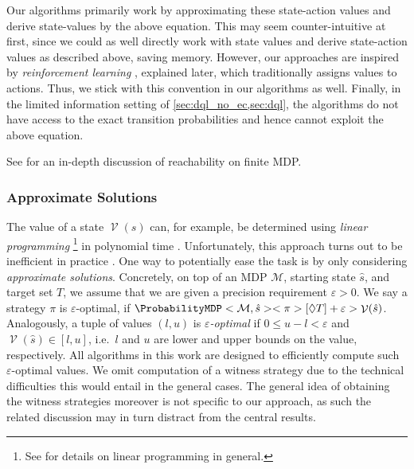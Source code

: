 \documentclass{article}
\newcommand{\MDP}{\mathcal{M}}
\newcommand{\initialstate}{\hat{s}}
\newcommand{\strategy}{\pi}
\newcommand{\reach}{\Diamond}
\DeclareMathOperator{\val}{\mathcal{V}}
\newcommand{\targetset}{T}
\begin{document}
\begin{remark}
	Our algorithms primarily work by approximating these state-action values and derive state-values by the above equation.
	This may seem counter-intuitive at first, since we could as well directly work with state values and derive state-action values as described above, saving memory.
	However, our approaches are inspired by \emph{reinforcement learning} \cite{DBLP:books/lib/SuttonB98}, explained later, which traditionally assigns values to actions.
	Thus, we stick with this convention in our algorithms as well.
	Finally, in the limited information setting of \cref{sec:dql_no_ec,sec:dql}, the algorithms do not have access to the exact transition probabilities and hence cannot exploit the above equation.
\end{remark}
See \cite[Section~4]{DBLP:conf/sfm/ForejtKNP11} for an in-depth discussion of reachability on finite MDP.

\subsubsection*{Approximate Solutions}

The value of a state $\val(s)$ can, for example, be determined using \emph{linear programming} \cite{10.1007/BFb0032043,DBLP:conf/sfm/ForejtKNP11}\footnote{See \cite{DBLP:books/daglib/0090562} for details on linear programming in general.} in polynomial time \cite{khachiyan1979polynomial,DBLP:journals/combinatorica/Karmarkar84}.
Unfortunately, this approach turns out to be inefficient in practice \cite{DBLP:conf/rp/HaddadM14,DBLP:conf/cav/AshokCDKM17}.
One way to potentially ease the task is by only considering \emph{approximate solutions}.
Concretely, on top of an MDP $\MDP$, starting state $\initialstate$, and target set $\targetset$, we assume that we are given a precision requirement $\varepsilon > 0$.
We say a strategy $\strategy$ is $\varepsilon$-optimal, if $\ProbabilityMDP<\MDP, \initialstate><\strategy>[\reach \targetset] + \varepsilon > \val(\initialstate)$.
Analogously, a tuple of values $(l, u)$ is \emph{$\varepsilon$-optimal} if $0 \leq u - l < \varepsilon$ and $\val(\initialstate) \in [l, u]$, i.e.\ $l$ and $u$ are lower and upper bounds on the value, respectively.
All algorithms in this work are designed to efficiently compute such $\varepsilon$-optimal values.
We omit computation of a witness strategy due to the technical difficulties this would entail in the general cases.
The general idea of obtaining the witness strategies moreover is not specific to our approach, as such the related discussion may in turn distract from the central results.
\end{document}
